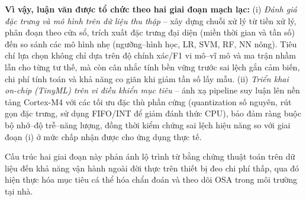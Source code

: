 \noindent\textbf{Vì vậy, luận văn được tổ chức theo hai giai đoạn mạch lạc:}
(i) \emph{Đánh giá đặc trưng và mô hình trên dữ liệu thu thập} – xây dựng chuỗi xử lý từ tiền xử lý, phân đoạn theo cửa sổ, trích xuất đặc trưng đại diện (miền thời gian và tần số) đến so sánh các mô hình nhẹ (ngưỡng–hình học, LR, SVM, RF, NN nông). Tiêu chí lựa chọn không chỉ dựa trên độ chính xác/F1 vi mô–vĩ mô và ma trận nhầm lẫn cho từng tư thế, mà còn cân nhắc tính bền vững trước sai lệch gắn cảm biến, chi phí tính toán và khả năng co giãn khi giảm tần số lấy mẫu.
(ii) \emph{Triển khai on-chip (TinyML) trên vi điều khiển mục tiêu} – ánh xạ pipeline suy luận lên nền tảng Cortex-M4 với các tối ưu đặc thù phần cứng (quantization số nguyên, rút gọn đặc trưng, sử dụng FIFO/INT để giảm đánh thức CPU), bảo đảm ràng buộc bộ nhớ–độ trễ–năng lượng, đồng thời kiểm chứng sai lệch hiệu năng so với giai đoạn (i) ở mức chấp nhận được cho ứng dụng thực tế.

Cấu trúc hai giai đoạn này phản ánh lộ trình từ bằng chứng thuật toán trên dữ liệu đến khả năng vận hành ngoài đời thực trên thiết bị đeo chi phí thấp, qua đó hiện thực hóa mục tiêu cá thể hóa chẩn đoán và theo dõi OSA trong môi trường tại nhà.














% 

